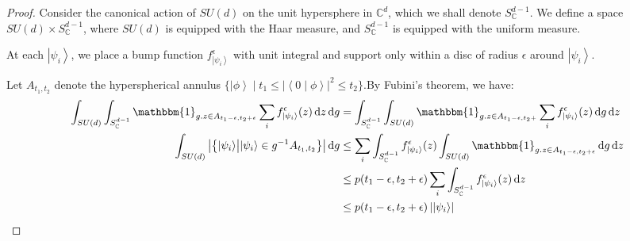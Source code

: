 \documentclass{amsart}
\theoremstyle{definition}
\newcommand{\ket}[1]{{\left\vert{#1}\right\rangle}}
\newcommand{\sprod}[2]{\left|\left< {#1} \middle| {#2} \right>\right|}
\newcommand*\dif{\mathop{}\!\mathrm{d}}
\begin{document}
\begin{proof}
Consider the canonical action of $SU(d)$ on the unit hypersphere in $\mathbb{C}^d$, which we shall denote $S_\mathbb{C}^{d-1}$. We define a space $SU(d)\times S_\mathbb{C}^{d-1}$, where $SU(d)$ is equipped with the Haar measure, and $S_\mathbb{C}^{d-1}$ is equipped with the uniform measure.

At each $\ket{\psi_i}$, we place a bump function $f^\epsilon_\ket{\psi_i}$ with unit integral and support only within a disc of radius $\epsilon$ around $\ket{\psi_i}$.

Let $A_{t_1,t_2}$ denote the hyperspherical annulus $\{\ket{\phi}\mid t_1\leq\sprod{0}{\phi}^2\leq t_2\}$.By Fubini's theorem, we have:
\begin{align}
\int_{SU(d)} \int_{S_\mathbb{C}^{d-1}} \mathbbm{1}_{g.z\in A_{t_1-\epsilon,t_2+\epsilon}} \sum_i f^\epsilon_\ket{\psi_i}(z) \dif z \dif g &= \int_{S_\mathbb{C}^{d-1}} \int_{SU(d)}  \mathbbm{1}_{g.z\in A_{t_1-\epsilon,t_2+}} \sum_i f^\epsilon_\ket{\psi_i}(z) \dif g \dif z \\
\int_{SU(d)} \left|\left\{\ket{\psi_i} \middle| \ket{\psi_i} \in g^{-1}A_{t_1,t_2}\right\}\right| \dif g  &\leq \sum_i\int_{S_\mathbb{C}^{d-1}}f^\epsilon_\ket{\psi_i}(z)  \int_{SU(d)} \mathbbm{1}_{g.z\in A_{t_1-\epsilon,t_2+\epsilon}} \dif g \dif z \label{eqn:1} \\
 &\leq p(t_1-\epsilon,t_2+\epsilon)\sum_i\int_{S_\mathbb{C}^{d-1}}f^\epsilon_\ket{\psi_i}(z)  \dif z \label{eqn:2} \\
&\leq p(t_1-\epsilon,t_2+\epsilon)\left|\ket{\psi_i}\right|
\end{align}


\end{proof}
\end{document}
